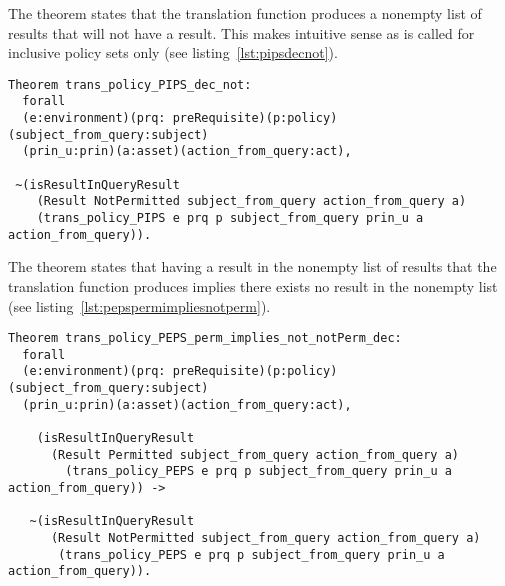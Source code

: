 The theorem  states that the translation function  produces a nonempty list of results that will not have a  result. This makes intuitive sense as  is called for inclusive policy sets only (see listing~\ref{lst:pipsdecnot}).
\begin{lstlisting}
Theorem trans_policy_PIPS_dec_not:
  forall
  (e:environment)(prq: preRequisite)(p:policy)(subject_from_query:subject)
  (prin_u:prin)(a:asset)(action_from_query:act),

 ~(isResultInQueryResult 
    (Result NotPermitted subject_from_query action_from_query a)
    (trans_policy_PIPS e prq p subject_from_query prin_u a action_from_query)).

\end{lstlisting}

The theorem  states that having a  result in the nonempty list of results that the translation function  produces implies there exists no  result in the nonempty list (see listing~\ref{lst:pepspermimpliesnotperm}).

\begin{minipage}[c]{0.95\textwidth}
\begin{lstlisting}
Theorem trans_policy_PEPS_perm_implies_not_notPerm_dec:
  forall
  (e:environment)(prq: preRequisite)(p:policy)(subject_from_query:subject)
  (prin_u:prin)(a:asset)(action_from_query:act),

    (isResultInQueryResult 
      (Result Permitted subject_from_query action_from_query a)
        (trans_policy_PEPS e prq p subject_from_query prin_u a action_from_query)) ->

   ~(isResultInQueryResult 
      (Result NotPermitted subject_from_query action_from_query a)
       (trans_policy_PEPS e prq p subject_from_query prin_u a action_from_query)).

\end{lstlisting}
\end{minipage}

